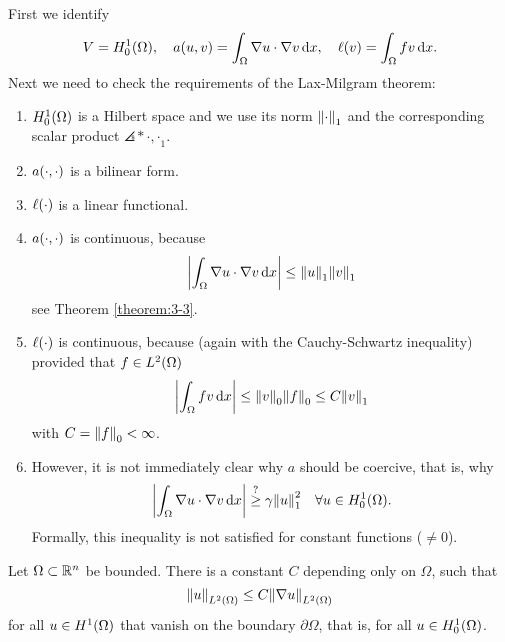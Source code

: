 \begin{example}
	First we identify
	\[
		V = H_0^1\parentheses*{\Omega}, \quad a\parentheses*{u, v} = \int_\Omega \nabla u \cdot \nabla v\d x, \quad \ell\parentheses*{v} = \int_\Omega fv\d x.
	\]
	Next we need to check the requirements of the Lax-Milgram theorem:
	\begin{enumerate}
		\item \(H_0^1\parentheses*{\Omega}\) is a Hilbert space and we use its norm \(\norm*{\cdot}_1\) and the corresponding scalar product \(\angles*{\cdot, \cdot}_1\).
		\item \(a\parentheses*{\cdot, \cdot}\) is a bilinear form.
		\item \(\ell\parentheses*{\cdot}\) is a linear functional.
		\item \(a\parentheses*{\cdot, \cdot}\) is continuous, because
		\[
			\absolute*{\int_\Omega \nabla u \cdot \nabla v\d x} \le \norm*{u}_1 \norm*{v}_1
		\]
		see Theorem \ref{theorem:3-3}.
		\item \(\ell\parentheses*{\cdot}\) is continuous, because (again with the Cauchy-Schwartz inequality) provided that \(f \in L^2\parentheses*{\Omega}\)
		\[
			\absolute*{\int_\Omega fv\d x} \le \norm*{v}_0 \norm*{f}_0 \le C\norm*{v}_1
		\]
		with \(C = \norm*{f}_0 < \infty\).
		\item However, it is not immediately clear why \(a\) should be coercive, that is, why
		\[
			\absolute*{\int_\Omega \nabla u \cdot \nabla v\d x} \stackrel{?}{\ge} \gamma\norm*{u}_1^2 \quad \forall u \in H_0^1\parentheses*{\Omega}.
		\]
		Formally, this inequality is not satisfied for constant functions (\(\ne 0\)).
	\end{enumerate}
\end{example}

\begin{theorem}
	Let \(\Omega \subset \R^n\) be bounded.
	There is a constant \(C\) depending only on \(\Omega\), such that
	\[
		\norm*{u}_{L^2\parentheses*{\Omega}} \le C\norm*{\nabla u}_{L^2\parentheses*{\Omega}}
	\]
	for all \(u \in H^1\parentheses*{\Omega}\) that vanish on the boundary \(\partial\Omega\), that is, for all \(u \in H_0^1\parentheses*{\Omega}\).
\end{theorem}

